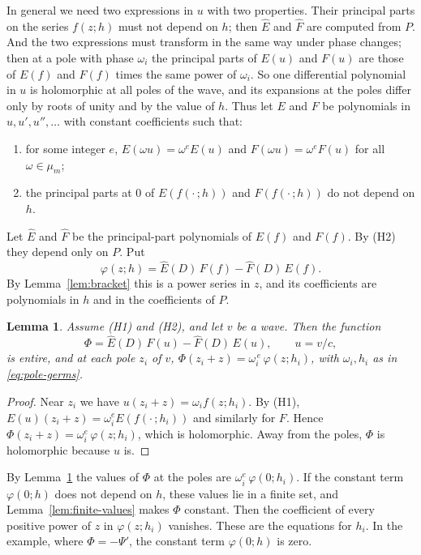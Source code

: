 \documentclass[11pt]{article}
\newtheorem{lemma}[theorem]{Lemma}
\theoremstyle{definition}
\theoremstyle{remark}
\numberwithin{equation}{section}
\newcommand{\hatt}[1]{\widehat{#1}}
\begin{document}
In general we need two expressions in \(u\) with two properties. Their
principal parts on the series \(f(z;h)\) must not depend on \(h\); then
\(\hatt E\) and \(\hatt F\) are computed from \(P\). And the two
expressions must transform in the same way under phase changes; then at
a pole with phase \(\omega_i\) the principal parts of \(E(u)\) and
\(F(u)\) are those of \(E(f)\) and \(F(f)\) times the same power of
\(\omega_i\). So one differential polynomial in \(u\) is holomorphic
at all poles of the wave, and its expansions at the poles differ only
by roots of unity and by the value of \(h\). Thus let \(E\) and \(F\)
be polynomials in \(u,u',u'',\dots\) with constant coefficients such
that:
\begin{enumerate}[label=\textup{(H\arabic*)},leftmargin=2.8em]
\item for some integer \(e\), \(E(\omega u)=\omega^eE(u)\) and
\(F(\omega u)=\omega^eF(u)\) for all \(\omega\in\mu_m\);
\item the principal parts at \(0\) of \(E(f(\cdot\,;h))\) and
\(F(f(\cdot\,;h))\) do not depend on \(h\).
\end{enumerate}
Let \(\hatt E\) and \(\hatt F\) be the principal-part polynomials of
\(E(f)\) and \(F(f)\). By (H2) they depend only on \(P\). Put
\begin{equation}\label{eq:phi-formal}
 \varphi(z;h)=\hatt E(D)\,F(f)-\hatt F(D)\,E(f) .
\end{equation}
By Lemma~\ref{lem:bracket} this is a power series in \(z\), and its
coefficients are polynomials in \(h\) and in the coefficients of \(P\).

\begin{lemma}\label{lem:bracket-wave}
Assume \textup{(H1)} and \textup{(H2)}, and let \(v\) be a wave. Then
the function
\[
 \Phi=\hatt E(D)\,F(u)-\hatt F(D)\,E(u),\qquad u=v/c,
\]
is entire, and at each pole \(z_i\) of \(v\),
\(\Phi(z_i+z)=\omega_i^{\,e}\,\varphi(z;h_i)\), with \(\omega_i,h_i\) as
in \eqref{eq:pole-germs}.
\end{lemma}

\begin{proof}
Near \(z_i\) we have \(u(z_i+z)=\omega_if(z;h_i)\). By (H1),
\(E(u)(z_i+z)=\omega_i^eE(f(\cdot\,;h_i))\) and similarly for \(F\).
Hence \(\Phi(z_i+z)=\omega_i^e\,\varphi(z;h_i)\), which is holomorphic.
Away from the poles, \(\Phi\) is holomorphic because \(u\) is.
\end{proof}

By Lemma~\ref{lem:bracket-wave} the values of \(\Phi\) at the poles are
\(\omega_i^e\,\varphi(0;h_i)\). If the constant term \(\varphi(0;h)\)
does not depend on \(h\), these values lie in a finite set, and
Lemma~\ref{lem:finite-values} makes \(\Phi\) constant. Then the coefficient of every positive power of \(z\) in
\(\varphi(z;h_i)\) vanishes. These are the equations for \(h_i\). In the example, where
\(\Phi=-\Psi'\), the constant term \(\varphi(0;h)\) is zero.
\end{document}
